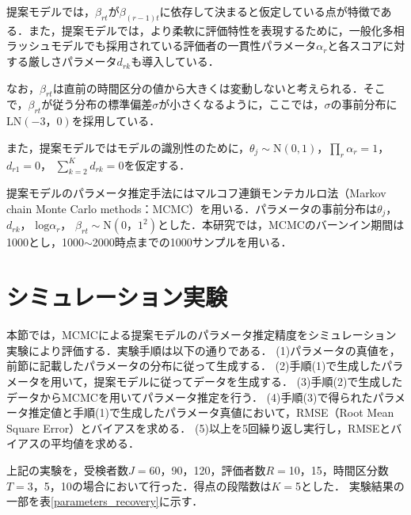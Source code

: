 \documentclass[dvipdfmx, twocolumn, a4paper]{hcresume}
\begin{document}
提案モデルでは，$\beta_{rt}$が$\beta_{(r-1)t}$に依存して決まると仮定している点が特徴である．また，提案モデルでは，より柔軟に評価特性を表現するために，一般化多相ラッシュモデルでも採用されている評価者の一貫性パラメータ$\alpha_r$と各スコアに対する厳しさパラメータ$d_{rk}$も導入している．

なお，$\beta_{rt}$は直前の時間区分の値から大きくは変動しないと考えられる．そこで，$\beta_{rt}$が従う分布の標準偏差$\sigma$が小さくなるように，ここでは，$\sigma$の事前分布に$\mathrm{LN}(−3，0)$を採用している．

また，提案モデルではモデルの識別性のために，$\theta_{j}\sim \mathrm{N}(0,1)$，$\prod_{r}\alpha_r=1$， $d_{r1}=0$， $\sum_{k=2}^{K}d_{rk}=0$を仮定する．

提案モデルのパラメータ推定手法にはマルコフ連鎖モンテカルロ法（Markov chain Monte Carlo methods：MCMC）を用いる．パラメータの事前分布は$\theta_{j}$， $d_{rk}$， $\mathrm{log}\alpha_{r}$， $\beta_{rt}\sim \mathrm{N}(0，1^{2})$とした．本研究では，MCMCのバーンイン期間は1000とし，1000$\sim$2000時点までの1000サンプルを用いる．
\section{シミュレーション実験}

本節では，MCMCによる提案モデルのパラメータ推定精度をシミュレーション実験により評価する．実験手順は以下の通りである．
(1)パラメータの真値を，前節に記載したパラメータの分布に従って生成する．
(2)手順(1)で生成したパラメータを用いて，提案モデルに従ってデータを生成する．
(3)手順(2)で生成したデータからMCMCを用いてパラメータ推定を行う．
(4)手順(3)で得られたパラメータ推定値と手順(1)で生成したパラメータ真値において，RMSE（Root Mean Square Error）とバイアスを求める．
(5)以上を5回繰り返し実行し，RMSEとバイアスの平均値を求める．

上記の実験を，受検者数$J=$60，90，120，評価者数$R=$10，15，時間区分数$T=$3，5，10の場合において行った．得点の段階数は$K=$5とした．
実験結果の一部を表\ref{parameters_recovery}に示す．
\end{document}

